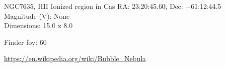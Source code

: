 \begin{block}{NGC7635, HII Ionized region in Cas}
    RA: 23:20:45.60, Dec: +61:12:44.5 \\ 
    Magnitude (V): None \\ 
    Dimensions: 15.0 x 8.0 

    Finder fov: 60 

    \url{https://en.wikipedia.org/wiki/Bubble_Nebula} 
\end{block}